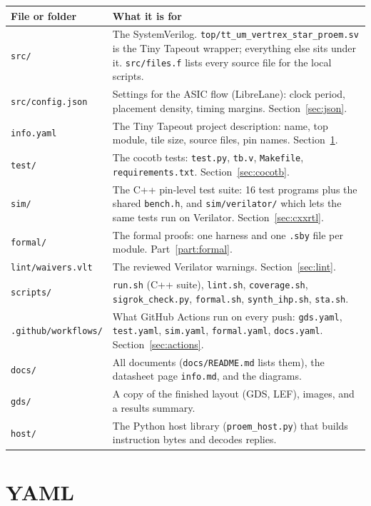 \documentclass[11pt,a4paper]{article}
\newcommand{\file}[1]{\texttt{#1}}
\begin{document}
\begin{center}
\begin{tabularx}{\linewidth}{@{}lL@{}}
\toprule
File or folder & What it is for \\
\midrule
\file{src/} & The SystemVerilog. \file{top/tt\_um\_vertrex\_star\_proem.sv} is the Tiny Tapeout wrapper; everything else sits under it. \file{src/files.f} lists every source file for the local scripts. \\
\file{src/config.json} & Settings for the ASIC flow (LibreLane): clock period, placement density, timing margins. Section~\ref{sec:json}. \\
\file{info.yaml} & The Tiny Tapeout project description: name, top module, tile size, source files, pin names. Section~\ref{sec:yaml}. \\
\file{test/} & The cocotb tests: \file{test.py}, \file{tb.v}, \file{Makefile}, \file{requirements.txt}. Section~\ref{sec:cocotb}. \\
\file{sim/} & The C++ pin-level test suite: 16 test programs plus the shared \file{bench.h}, and \file{sim/verilator/} which lets the same tests run on Verilator. Section~\ref{sec:cxxrtl}. \\
\file{formal/} & The formal proofs: one harness and one \file{.sby} file per module. Part~\ref{part:formal}. \\
\file{lint/waivers.vlt} & The reviewed Verilator warnings. Section~\ref{sec:lint}. \\
\file{scripts/} & \file{run.sh} (C++ suite), \file{lint.sh}, \file{coverage.sh}, \file{sigrok\_check.py}, \file{formal.sh}, \file{synth\_ihp.sh}, \file{sta.sh}. \\
\file{.github/workflows/} & What GitHub Actions run on every push: \file{gds.yaml}, \file{test.yaml}, \file{sim.yaml}, \file{formal.yaml}, \file{docs.yaml}. Section~\ref{sec:actions}. \\
\file{docs/} & All documents (\file{docs/README.md} lists them), the datasheet page \file{info.md}, and the diagrams. \\
\file{gds/} & A copy of the finished layout (GDS, LEF), images, and a results summary. \\
\file{host/} & The Python host library (\file{proem\_host.py}) that builds instruction bytes and decodes replies. \\
\bottomrule
\end{tabularx}
\end{center}

\section{YAML}\label{sec:yaml}
\end{document}
